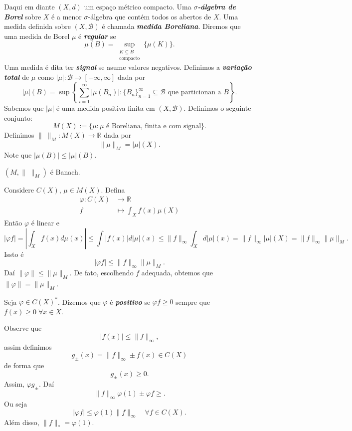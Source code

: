 \documentclass[portuguese]{article}
\theoremstyle{definition}
\newcommand{\R}{\mathbb{R}}
\begin{document}
Daqui em diante $(X,d)$ um espaço métrico compacto. Uma \textbf{\textit{$\sigma$-álgebra de Borel}} sobre $X$ é a menor $\sigma$-álgebra que contém todos os abertos de $X$. Uma medida definida sobre $(X,\mathcal{B})$ é chamada \textbf{\textit{medida Boreliana}}. Diremos que uma medida de Borel $\mu$ é \textbf{\textit{regular}} se
\[\mu(B)=\sup_{\substack{K\subseteq B\\\text{compacto}}}\{\mu(K)\}.\]
Uma medida é dita ter \textbf{\textit{signal}} se asume valores negativos. Definimos a \textbf{\textit{variação total}} de $\mu$ como $|\mu|:\mathcal{B}\to[-\infty,\infty]$ dada por
\[|\mu|(B)=\sup\left\{\sum_{i=1}^\infty|\mu(B_n)|:\{B_n\}_{n=1}^\infty\subseteq\mathcal{B}\text{ que particionan a }B\right\}.\]
Sabemos que $|\mu|$ é uma medida positiva finita em $(X,\mathcal{B})$. Definimos o seguinte conjunto:
\[M(X):=\{\mu:\mu\text{ é Boreliana, finita e com signal}\}.\]
Definimos $\|\;\|_M:M(X)\to\R$ dada por
\[\|\mu\|_M=|\mu|(X).\]
Note que $|\mu(B)|\leq|\mu|(B)$.
\begin{exer*}
	$(M,\|\;\|_M)$ é Banach.
\end{exer*}
\begin{exemplo}
	Considere $C(X)$, $\mu\in M(X)$. Defina
	\begin{align*}
		\varphi:C(X)&\to\R\\
		f&\mapsto\int_Xf(x)\mu(X)
	\end{align*}
	Então $\varphi$ é linear e
	\[|\varphi f|=\left|\int_Xf(x)d\mu(x)\right|\leq\int|f(x)|d|\mu|(x)\leq\|f\|_\infty\int_Xd|\mu|(x)=\|f\|_\infty|\mu|(X)=\|f\|_\infty\|\mu\|_M.\]
	Issto é
	\[|\varphi f|\leq\|f\|_\infty\|\mu\|_M.\]
	Daí $\|\varphi\|\leq\|\mu\|_{M}$. De fato, escolhendo $f$ adequada, obtemos que $\|\varphi\|=\|\mu\|_M$.
\end{exemplo}
\begin{defn}
	Seja $\varphi\in C(X)^*$. Dizemos que $\varphi$ é \textbf{\textit{positivo}} se $\varphi f\geq0$ sempre que $f(x)\geq0\;\forall x\in X$. 
\end{defn}
Observe que 
\[|f(x)|\leq\|f\|_\infty,\]
assim definimos
\[g_\pm(x)=\|f\|_\infty\pm f(x)\in C(X)\]
de forma que
\[g_\pm(x)\geq0.\]
Assim, $\varphi g_\pm$. Daí
\[\|f\|_\infty\varphi(1)\pm\varphi f\geq.\]
Ou seja
\[|\varphi f|\leq\varphi(1)\|f\|_\infty\quad\forall f\in C(X).\]
Além disso, $\|f\|_*=\varphi(1)$.
\end{document}
